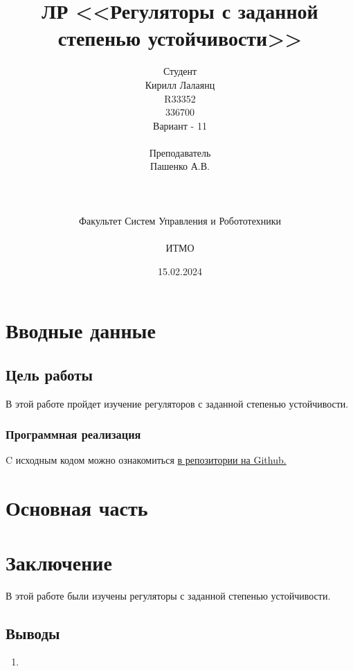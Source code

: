 \documentclass[16pt]{article}
\title{ЛР \textnumero 9 <<Регуляторы с заданной степенью устойчивости>>}
\author{
Студент \\
Кирилл Лалаянц\\
R33352\\
336700\\
Вариант - 11\\
\\
Преподаватель\\
Пашенко А.В. \\
\\
\\
\\
Факультет Систем Управления и Робототехники\\
\\
ИТМО\\
}
\date{15.02.2024}
\begin{document}
\maketitle
\newpage
\tableofcontents
\thispagestyle{empty}

\newpage
\setcounter{page}{1}
\section{Вводные данные}
\subsection{Цель работы}
В этой работе пройдет изучение регуляторов с заданной степенью устойчивости.

\subsubsection{Программная реализация}
C исходным кодом можно ознакомиться \href{https://github.com/lalayants/control-theory-itmo-2023-2024}{в репозитории на Github.}


\newpage
\section{Основная часть}

\FloatBarrier
\newpage

\FloatBarrier
\newpage

\FloatBarrier


\newpage
\section{Заключение}
В этой работе были изучены регуляторы с заданной степенью устойчивости.
\subsection{Выводы}
\begin{enumerate}
   \item 
\end{enumerate}
\end{document}
